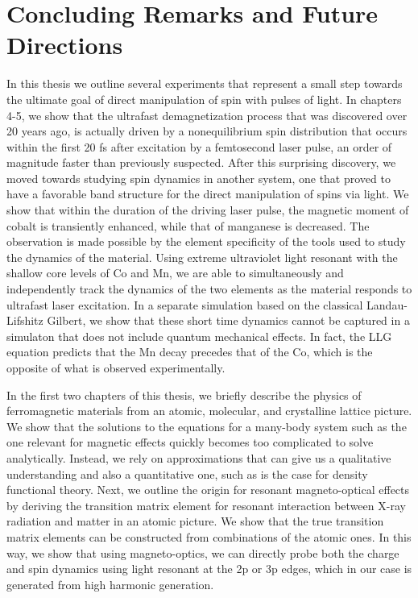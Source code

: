\chapter{Concluding Remarks and Future Directions}

In this thesis we outline several experiments that represent a small step towards the ultimate goal of direct manipulation of spin with pulses of light. In chapters 4-5, we show that the ultrafast demagnetization process that was discovered over 20 years ago, is actually driven by a nonequilibrium spin distribution that occurs within the first 20 fs after excitation by a femtosecond laser pulse, an order of magnitude faster than previously suspected. After this surprising discovery, we moved towards studying spin dynamics in another system, one that proved to have a favorable band structure for the direct manipulation of spins via light. We show that within the duration of the driving laser pulse, the magnetic moment of cobalt is transiently enhanced, while that of manganese is decreased. The observation is made possible by the element specificity of the tools used to study the dynamics of the material. Using extreme ultraviolet light resonant with the shallow core levels of Co and Mn, we are able to simultaneously and independently track the dynamics of the two elements as the material responds to ultrafast laser excitation. In a separate simulation based on the classical Landau-Lifshitz Gilbert, we show that these short time dynamics cannot be captured in a simulaton that does not include quantum mechanical effects. In fact, the LLG equation predicts that the Mn decay precedes that of the Co, which is the opposite of what is observed experimentally.

In the first two chapters of this thesis, we briefly describe the physics of ferromagnetic materials from an atomic, molecular, and crystalline lattice picture. We show that the solutions to the equations for a many-body system such as the one relevant for magnetic effects quickly becomes too complicated to solve analytically. Instead, we rely on approximations that can give us a qualitative understanding and also a quantitative one, such as is the case for density functional theory. Next, we outline the origin for resonant magneto-optical effects by deriving the transition matrix element for resonant interaction between X-ray radiation and matter in an atomic picture. We show that the true transition matrix elements can be constructed from combinations of the atomic ones. In this way, we show that using magneto-optics, we can directly probe both the charge and spin dynamics using light resonant at the 2p or 3p edges, which in our case is generated from high harmonic generation.

